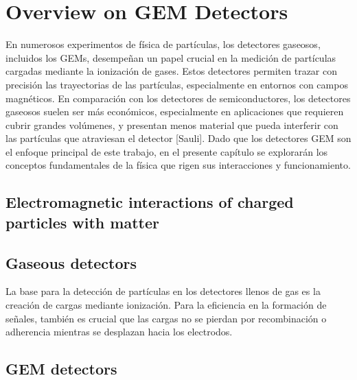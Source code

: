 \documentclass[]{book}
\begin{document}
\chapter*{Overview on GEM Detectors}

En numerosos experimentos de física de partículas, los detectores gaseosos, incluidos los GEMs, desempeñan un papel crucial en la medición de partículas cargadas mediante la ionización de gases. Estos detectores permiten trazar con precisión las trayectorias de las partículas, especialmente en entornos con campos magnéticos. En comparación con los detectores de semiconductores, los detectores gaseosos suelen ser más económicos, especialmente en aplicaciones que requieren cubrir grandes volúmenes, y presentan menos material que pueda interferir con las partículas que atraviesan el detector [Sauli]. Dado que los detectores GEM son el enfoque principal de este trabajo, en el presente capítulo se explorarán los conceptos fundamentales de la física que rigen sus interacciones y funcionamiento.

\section{Electromagnetic interactions of charged particles with matter}

\section{Gaseous detectors}

\noindent La base para la detección de partículas en los detectores llenos de gas es la creación de cargas mediante ionización. Para la eficiencia en la formación de señales, también es crucial que las cargas no se pierdan por recombinación o adherencia mientras se desplazan hacia los electrodos.

\section{GEM detectors}
\end{document}
